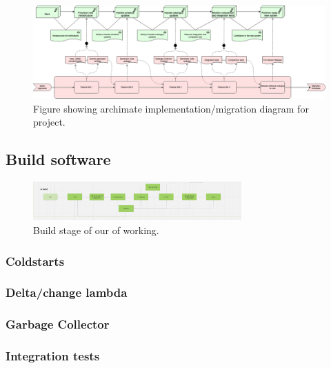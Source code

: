   \newpage

  \begin{landscape}
    \begin{figure}
      \centering
      \includegraphics[width=20cm]{assets/migration.drawio.png}
      \caption{Figure showing archimate implementation/migration diagram for project.}
      \label{fig:migration}
    \end{figure}
  \end{landscape}

  \newpage
  \subsection{Build software}

  \begin{figure}[H]
    \centering
    \includegraphics[width=8cm]{assets/workflow/build.png}
    \caption{Build stage of our of working.}
    \label{fig:workflowBuild}
  \end{figure}

  \subsubsection{Coldstarts}

  \subsubsection{Delta/change lambda}

  \subsubsection{Garbage Collector}

  \subsubsection{Integration tests}

